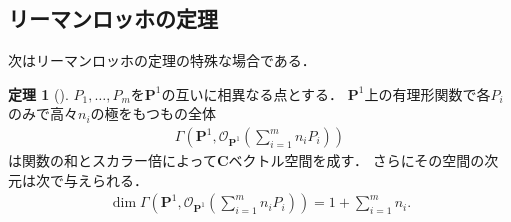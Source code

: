 \documentclass[11pt, a4paper, dvipdfmx, draft]{jsarticle}
\theoremstyle{definition}
\newtheorem{Theorem}[Axiom]{定理}
\newcommand{\cc}{\mathbf{C}}
\newcommand{\pp}{\mathbf{P}}
\newcommand{\mcal}{\mathcal}
\newcommand{\OO}{\mcal{O}}
\theoremstyle{mystyle}
\numberwithin{equation}{section} %
\begin{document}
\subsection{リーマンロッホの定理}

次はリーマンロッホの定理の特殊な場合である．

\begin{Theorem}[{\cite[命題1.14]{ogs}}]
    $P_{1},\dots,P_{m}$を$\pp^{1}$の互いに相異なる点とする．
    $\pp^{1}$上の有理形関数で各$P_i$のみで高々$n_i$の極をもつもの全体
    \begin{align*}
        \Gamma\left(\pp^{1}, \OO_{\pp^{1}}\left(\sum_{i=1}^{m}n_{i}P_{i}\right)\right)
    \end{align*}
    は関数の和とスカラー倍によって$\cc$ベクトル空間を成す．
    さらにその空間の次元は次で与えられる．
    \begin{align*}
        \dim\Gamma\left(
            \pp^{1}, \OO_{\pp^{1}}\left(
                \sum_{i=1}^{m}n_{i}P_{i}
                \right)
            \right)
        = 1+\sum_{i=1}^{m}n_{i}.
    \end{align*}
\end{Theorem}

\newcommand{\rrsp}{\Gamma\left(\pp^{1}, \OO_{\pp^{1}}\left(\sum_{i=1}^{m}n_{i}P_{i}\right)\right)}
\end{document}
